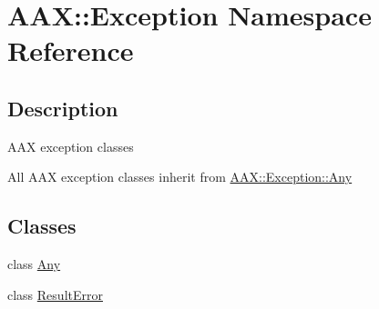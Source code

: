 \hypertarget{a00853}{}\section{A\+AX\+::Exception Namespace Reference}
\label{a00853}


\subsection{Description}
A\+AX exception classes 

All A\+AX exception classes inherit from \mbox{\hyperlink{a01593}{A\+A\+X\+::\+Exception\+::\+Any}} \subsection*{Classes}
\begin{DoxyCompactItemize}
\item 
class \mbox{\hyperlink{a01593}{Any}}
\item 
class \mbox{\hyperlink{a01597}{Result\+Error}}
\end{DoxyCompactItemize}
